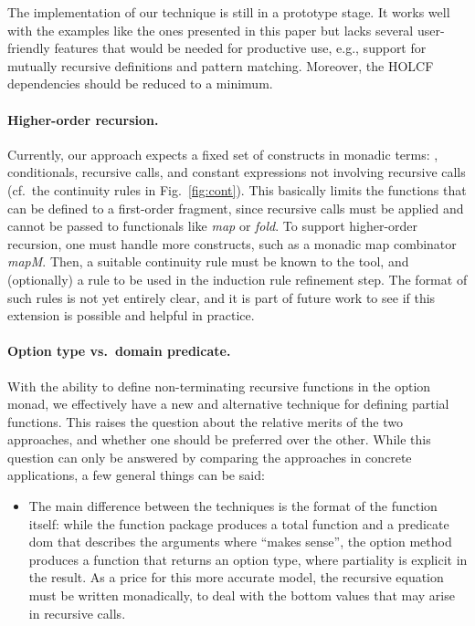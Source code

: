 \documentclass[copyright,creativecommons,sharealike]{eptcs}
\theoremstyle{remark}
\begin{document}
\begin{isabellebody}
\begin{isamarkuptext}
The implementation of our technique is still in a prototype stage.  It
works well with the examples like the ones presented in this paper
but lacks several user-friendly features that would be needed for
productive use, e.g., support for mutually recursive
definitions and pattern matching. Moreover, the HOLCF dependencies
should be reduced to a minimum.

\paragraph{Higher-order recursion.}

Currently, our approach expects a fixed set of constructs in
monadic terms: \isa{{\isasymguillemotright}{\isacharequal}}, conditionals, recursive calls, and
  constant expressions not involving recursive calls (cf.\ the
continuity rules in Fig.~\ref{fig:cont}).
This basically limits the functions that can be defined to a
first-order fragment, since recursive calls must be applied and cannot
  be passed to functionals like \emph{map} or
\emph{fold}. To support higher-order recursion, one must handle more constructs, such as
a monadic map combinator \emph{mapM}.  Then, a suitable continuity
rule must be known to the tool, and (optionally) a rule to be used in
the induction rule refinement step.  The format of such rules is not
yet entirely clear, and it is part of future work to see if this
extension is possible and helpful in practice.


\paragraph{Option type vs.\ domain predicate.}

With the ability to define non-terminating recursive functions in the
option monad, we effectively have a new and alternative technique for
defining partial functions.  This raises the question about the
relative merits of the two approaches, and whether one should be
preferred over the other.
While this question can only be answered by comparing the approaches
  in concrete applications, a
few general things can be said:
\begin{itemize}
\item 
The main difference between the techniques is the format of
the function itself: while the function package produces a total
function and a predicate dom that describes
the arguments  where  ``makes sense'', the option method
produces a function that returns an option type, where partiality is 
explicit in the result. As a price for this more accurate model, the
recursive equation must be written monadically, to deal with the
bottom values that may arise in recursive calls.


\end{itemize}
\end{isamarkuptext}
\end{isabellebody}
\end{document}
